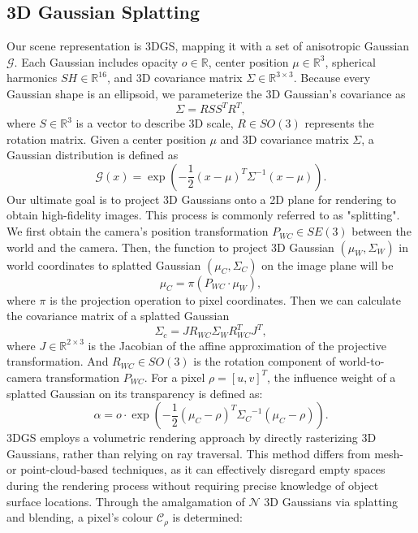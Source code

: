 \documentclass[lettersize,journal]{IEEEtran}
\begin{document}
\subsection{3D Gaussian Splatting}
Our scene representation is 3DGS, mapping it with a set of anisotropic Gaussian $\mathcal{G}$. Each Gaussian includes opacity $o\in\mathbb{R}$, center position $\mu\in\mathbb{R}^3$, spherical harmonics $SH\in\mathbb{R}^{16}$, and 3D covariance matrix $\Sigma\in\mathbb{R}^{3\times3}$.
Because every Gaussian shape is an ellipsoid, we parameterize the 3D Gaussian’s covariance as
\begin{equation}
\Sigma = RSS^TR^T,
\label{eq:Sigma}
\end{equation}
where $S\in\mathbb{R}^3$ is a vector to describe 3D scale, $R \in{SO(3)}$ represents the rotation matrix.
Given a center position $\mu$ and 3D covariance matrix $\Sigma$, a Gaussian distribution is defined as 
\begin{equation}
\mathcal{G}(x)= \exp(-\frac{1}{2}(x-\mu)^{T}\Sigma^{-1}(x-\mu)).
\label{eq:Dx}
\end{equation}
Our ultimate goal is to project 3D Gaussians onto a 2D plane for rendering to obtain high-fidelity images. This process is commonly referred to as "splitting". We first obtain the camera's position transformation ${P}_{WC}\in{SE(3)}$ between the world and the camera. Then, the function to project 3D Gaussian $(\mu_{W},\Sigma_{W})$ in world coordinates to splatted Gaussian $(\mu_{C},\Sigma_{C})$ on the image plane will be 
\begin{equation}
\mu_{C} = \pi({P}_{WC}\cdot\mu_{W}),
\label{eq:muI}
\end{equation}
where $\pi$ is the projection operation to pixel coordinates. Then we can calculate the covariance matrix of a splatted Gaussian
\begin{equation}
\Sigma_{c} = J{R}_{WC}\Sigma_{W}{R}_{WC}^{T}J^{T} ,
\label{eq:sigmaI}
\end{equation}
where $J\in\mathbb{R}^{2\times3}$ is the Jacobian of the affine approximation of the projective transformation. And ${R}_{WC}\in{SO(3)}$ is the rotation component of world-to-camera transformation ${P}_{WC}$.
For a pixel $\rho = [u,v]^{T}$, the influence weight of a splatted Gaussian on its transparency is defined as:
\begin{equation}
\mathcal{\alpha}= o\cdot\exp(-\frac{1}{2}(\mu_{C}-\rho)^{T}{\Sigma_{C}}^{-1}(\mu_{C}-\rho)).
\label{eq:alpha}
\end{equation}
3DGS employs a volumetric rendering approach by directly rasterizing 3D Gaussians, rather than relying on ray traversal. This method differs from mesh- or point-cloud-based techniques, as it can effectively disregard empty spaces during the rendering process without requiring precise knowledge of object surface locations. Through the amalgamation of $\mathcal{N}$ 3D Gaussians via splatting and blending, a pixel's colour $\mathcal{C}_{\rho}$ is determined:
\end{document}
